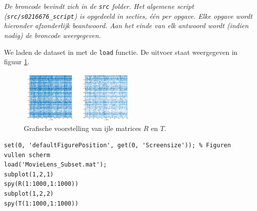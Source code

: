 
\begin{center}
\textit{De broncode bevindt zich in de \texttt{src} folder. Het algemene script (\texttt{src/s0216676\_script}) is opgedeeld in secties, \'e\'en per opgave. Elke opgave wordt hieronder afzonderlijk beantwoord. Aan het einde van elk antwoord wordt (indien nodig) de broncode weergegeven.}
\end{center}



We laden de dataset in met de \texttt{load} functie. De uitvoer staat weergegeven in figuur \ref{fig:op1}.

\vspace{0.3cm}
\begin{figure}[h]
\centering
\includegraphics[width=0.5\textwidth]{res/op1.png}
\caption{Grafische voorstelling van ijle matrices $R$ en $T$.}
\label{fig:op1}
\end{figure}

\begin{lstlisting}
set(0, 'defaultFigurePosition', get(0, 'Screensize')); % Figuren vullen scherm
load('MovieLens_Subset.mat');
subplot(1,2,1)
spy(R(1:1000,1:1000))
subplot(1,2,2)
spy(T(1:1000,1:1000))
\end{lstlisting}



